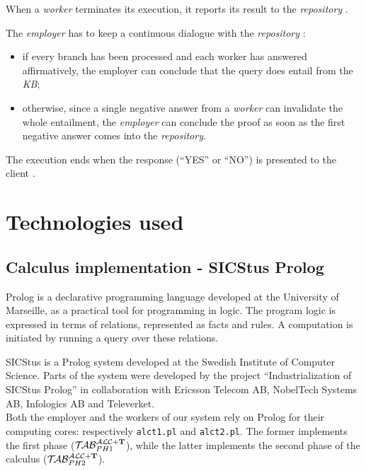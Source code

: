 \documentclass[a4paper, 11pt, oneside]{duthesis}
\newcommand*\circled[1]{\tikz[baseline=(char.base)]{
            \node[shape=circle,draw,inner sep=2pt] (char) {#1};}}
\newcommand{\tip}{{\bf T}}
\newcommand{\primo}{\mathrel{{\mathcal{T}\!\mathcal{AB}}}_{PH 1}^{\mathcal{ALC}+\mbox{\scriptsize $\tip$}}}
\newcommand{\secondo}{\mathrel{{\mathcal{T}\!\mathcal{AB}}}_{PH 2}^{\mathcal{ALC}+\mbox{\scriptsize $\tip$}}}
\begin{document}
When a \emph{worker} terminates its execution, it reports its result to the \emph{repository} \circled{3}.

The \emph{employer} has to keep a continuous dialogue with the \emph{repository} \circled{4}:
\begin{itemize}
\item if every branch has been processed and each worker has answered affirmatively, the employer can conclude that the query does entail from the \emph{KB};
\item otherwise, since a single negative answer from a \emph{worker} can invalidate the whole entailment, the \emph{employer} can conclude the proof as soon as the first negative answer comes into the \emph{repository}.
\end{itemize}
The execution ends when the response (``YES'' or ``NO'') is presented to the client \circled{5}.

\newpage

\section{Technologies used}\label{tech}


\subsection{Calculus implementation - SICStus Prolog}

Prolog is a declarative programming language developed at the University of Marseille, as a practical tool for programming in logic. The program logic is expressed in terms of relations, represented as facts and rules. A computation is initiated by running a query over these relations\cite{Lloyd:1984:FLP:2214}.

SICStus is a Prolog system developed at the Swedish Institute of Computer Science. Parts of the system were developed by the project “Industrialization of SICStus Prolog” in collaboration with Ericsson Telecom AB, NobelTech Systems AB, Infologics AB and Televerket\cite{sicstus_intro}.\\

Both the employer and the workers of our system rely on Prolog for their computing cores: respectively \verb$alct1.pl$ and \verb$alct2.pl$. The former implements the first phase ($\primo$), while the latter implements the second phase of the calculus ($\secondo$).
\end{document}
